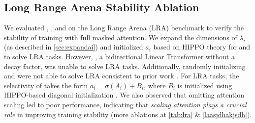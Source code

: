\subsection{Long Range Arena Stability Ablation}

We  evaluated \lions, \lionretnet, and \lionlit on the Long Range Arena (LRA) benchmark to verify the stability of training with full masked attention. We expand the dimensions of \(\lambda_i\) (as described in \cref{sec:expandai}) and initialized \(a_i\) based on HIPPO theory \cite{hippo} for \lions and \lionretnet to solve LRA tasks. However, \lionlit, a bidirectional Linear Transformer without a decay factor, was unable to solve LRA tasks. Additionally, randomly initializing \lions and \lionretnet were not able to solve LRA consistent to prior work \cite{nts}. For LRA tasks, the selectivity of \lions takes the form \(a_i = \sigma(A_i) + B_i\), where \(B_i\) is initialized using HIPPO-based diagonal initialization \cite{gupta2022diagonalstatespaceseffective}. We also observed that omitting attention scaling led to poor performance, indicating that \textit{scaling attention plays a crucial role} in improving training stability (more ablations at \cref{tab:lra} \& \cref{laasjdhakjsdh}).

\begin{table}[t] 
    \centering
        \caption{\textit{Training Stability on Long Range Arena Task.} Our family of models can solve the LRA benchmark with the appropriate initialization using full attention. 
       }
    \vspace{-2mm}
    \label{tab:lra_exp} \vspace{-4mm}
\end{table}




